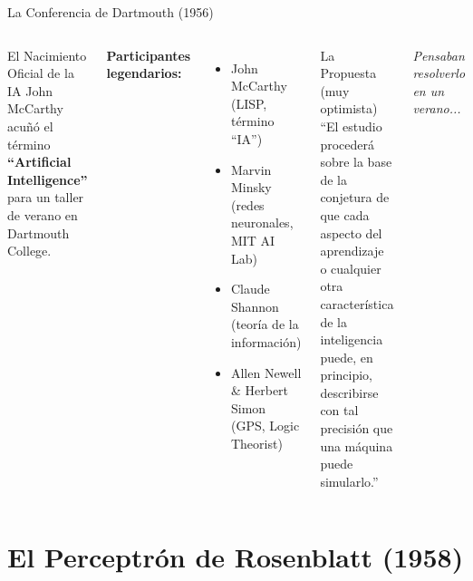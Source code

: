 \documentclass[aspectratio=169]{beamer}
\begin{document}
\begin{frame}{La Conferencia de Dartmouth (1956)}
    \begin{columns}
        \begin{block}{El Nacimiento Oficial de la IA}
            John McCarthy acuñó el término \textbf{``Artificial Intelligence''} para un taller de verano en Dartmouth College.
        \end{block}
        
        \vspace{0.3cm}
        \textbf{Participantes legendarios:}
        \begin{itemize}
            \item John McCarthy (LISP, término ``IA'')
            \item Marvin Minsky (redes neuronales, MIT AI Lab)
            \item Claude Shannon (teoría de la información)
            \item Allen Newell \& Herbert Simon (GPS, Logic Theorist)
        \end{itemize}
        
        \begin{alertblock}{La Propuesta (muy optimista)}
            ``El estudio procederá sobre la base de la conjetura de que cada aspecto del aprendizaje o cualquier otra característica de la inteligencia puede, en principio, describirse con tal precisión que una máquina puede simularlo.''
        \end{alertblock}
        
        \vspace{0.2cm}
        \textit{Pensaban resolverlo en un verano...}
    \end{columns}
\end{frame}

\section{El Perceptrón de Rosenblatt (1958)}
\end{document}
